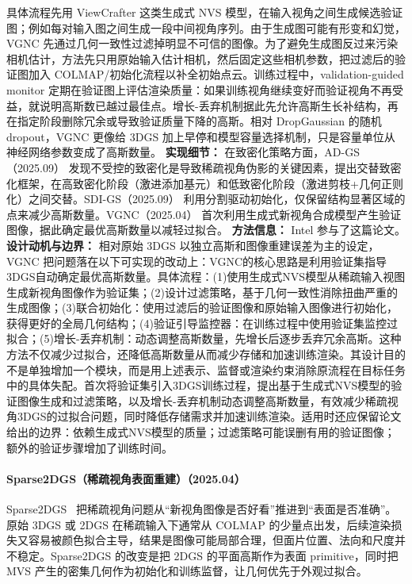 具体流程先用 ViewCrafter 这类生成式 NVS 模型，在输入视角之间生成候选验证图；例如每对输入图之间生成一段中间视角序列。由于生成图可能有形变和幻觉，VGNC 先通过几何一致性过滤掉明显不可信的图像。为了避免生成图反过来污染相机估计，方法先只用原始输入估计相机，然后固定这些相机参数，把过滤后的验证图加入 COLMAP/初始化流程以补全初始点云。训练过程中，validation-guided monitor 定期在验证图上评估渲染质量：如果训练视角继续变好而验证视角不再受益，就说明高斯数已越过最佳点。增长-丢弃机制据此先允许高斯生长补结构，再在指定阶段删除冗余或导致验证质量下降的高斯。相对 DropGaussian 的随机 dropout，VGNC 更像给 3DGS 加上早停和模型容量选择机制，只是容量单位从神经网络参数变成了高斯数量。
\textbf{实现细节：} 在致密化策略方面，AD-GS（2025.09） 发现不受控的致密化是导致稀疏视角伪影的关键因素，提出交替致密化框架，在高致密化阶段（激进添加基元）和低致密化阶段（激进剪枝+几何正则化）之间交替。SDI-GS（2025.09） 利用分割驱动初始化，仅保留结构显著区域的点来减少高斯数量。VGNC（2025.04） 首次利用生成式新视角合成模型产生验证图像，据此确定最优高斯数量以减轻过拟合。
\textbf{方法信息：} Intel 参与了这篇论文。
\textbf{设计动机与边界：} 相对原始 3DGS 以独立高斯和图像重建误差为主的设定，VGNC 把问题落在以下可实现的改动上：VGNC的核心思路是利用验证集指导3DGS自动确定最优高斯数量。具体流程：(1)使用生成式NVS模型从稀疏输入视图生成新视角图像作为验证集；(2)设计过滤策略，基于几何一致性消除扭曲严重的生成图像；(3)联合初始化：使用过滤后的验证图像和原始输入图像进行初始化，获得更好的全局几何结构；(4)验证引导监控器：在训练过程中使用验证集监控过拟合；(5)增长-丢弃机制：动态调整高斯数量，先增长后逐步丢弃冗余高斯。这种方法不仅减少过拟合，还降低高斯数量从而减少存储和加速训练渲染。其设计目的不是单独增加一个模块，而是用上述表示、监督或渲染约束消除原流程在目标任务中的具体失配。首次将验证集引入3DGS训练过程，提出基于生成式NVS模型的验证图像生成和过滤策略，以及增长-丢弃机制动态调整高斯数量，有效减少稀疏视角3DGS的过拟合问题，同时降低存储需求并加速训练渲染。适用时还应保留论文给出的边界：依赖生成式NVS模型的质量；过滤策略可能误删有用的验证图像；额外的验证步骤增加了训练时间。
\paragraph{Sparse2DGS（稀疏视角表面重建）（2025.04）}
Sparse2DGS~\cite{2504_20378} 把稀疏视角问题从“新视角图像是否好看”推进到“表面是否准确”。原始 3DGS 或 2DGS 在稀疏输入下通常从 COLMAP 的少量点出发，后续渲染损失又容易被颜色拟合主导，结果是图像可能局部合理，但面片位置、法向和尺度并不稳定。Sparse2DGS 的改变是把 2DGS 的平面高斯作为表面 primitive，同时把 MVS 产生的密集几何作为初始化和训练监督，让几何优先于外观过拟合。

